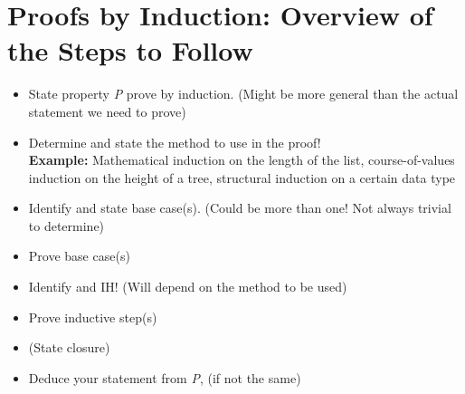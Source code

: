 \section{Proofs by Induction: Overview of the Steps to Follow} %
\label{sec:proofs_by_induction_overview_of_the_steps_to_follow}
\begin{itemize}
    \item State property \emph{P} prove by induction. (Might be more general than the actual statement we need to prove)
    \item {\color{red} Determine and state the method to use in the proof!}\\
    \textbf{Example:} Mathematical induction on the length of the list, course-of-values induction on the height of a tree, structural induction on a certain data type
    \item Identify and state base case(s). (Could be more than one! Not always trivial to determine)
    \item Prove base case(s)
    \item Identify and IH! (Will depend on the method to be used)
    \item Prove inductive step(s)
    \item (State closure)
    \item Deduce your statement from \emph{P}, (if not the same)
\end{itemize}


